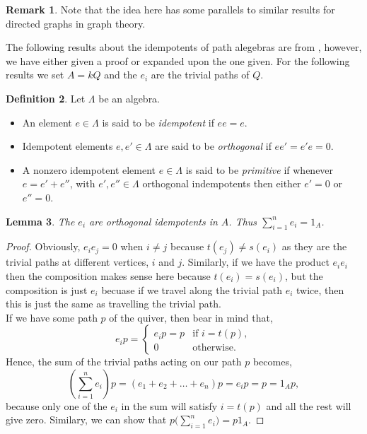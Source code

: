 \documentclass[11.5pt, twoside, a4paper, titlepage]{report}
\theoremstyle{definition}
\newtheorem{mydef}{Definition}[section]
\newtheorem{rem}[mydef]{Remark}
\theoremstyle{plain}
\newtheorem{lem}[mydef]{Lemma}
\begin{document}
\begin{rem}
Note that the idea here has some parallels to similar results for directed graphs in graph theory.
\end{rem}

The following results about the idempotents of path alegebras are from \cite{CB2}, however, we have either given a proof or expanded upon the one given. For the following results we set $A=kQ$ and the $e_i$ are the trivial paths of $Q$.

\begin{mydef} 
Let $\Lambda$ be an algebra.
\begin{itemize}
\item An element $e\in \Lambda$ is said to be \emph{idempotent} if $ee=e$.
\item Idempotent elements $e,e'\in \Lambda$ are said to be \emph{orthogonal} if $ee'=e'e=0$.
\item A nonzero idempotent element $e\in \Lambda$ is said to be \emph{primitive} if whenever $e=e'+e''$, with $e',e''\in \Lambda$ orthogonal indempotents then either $e'=0$ or $e''=0$.
\end{itemize}
\end{mydef}

\begin{lem} \label{identitylem}
The $e_i$ are orthogonal idempotents in $A$. Thus $\sum_{i=1}^{n}{e_i}=1_{A}$.
\end{lem}
\begin{proof}
Obviously, $e_ie_j=0$ when $i\neq j$ because $t(e_j)\neq s(e_i)$ as they are the trivial paths at different vertices, $i$ and $j$. Similarly, if we have the product $e_ie_i$ then the composition makes sense here because $t(e_i)=s(e_i)$, but the composition is just $e_i$ becuase if we travel along the trivial path $e_i$ twice, then this is just the same as travelling the trivial path. \\
If we have some path $p$ of the quiver, then bear in mind that,
\begin{equation*}
e_ip=
\begin{cases}
e_ip=p & \text{if } i=t(p),\\
0 & \text{otherwise.}
\end{cases}
\end{equation*}
Hence, the sum of the trivial paths acting on our path $p$ becomes, 
\begin{equation*}
\left(\sum^{n}_{i=1}{e_i}\right)p=(e_1+e_2+\dots +e_n)p=e_ip=p=1_Ap,
\end{equation*}
because only one of the $e_i$ in the sum will satisfy $i=t(p)$ and all the rest will give zero. Similary, we can show that $p\big(\sum^{n}_{i=1}{e_i}\big)=p1_A$.
\end{proof}
\end{document}
